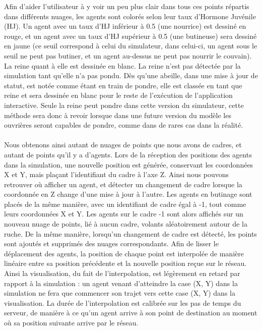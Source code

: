 		Afin d'aider l'utilisateur à y voir un peu plus clair dans tous ces points répartis dans différents nuages, les agents sont colorés selon leur taux d'Hormone Juvénile (HJ). Un agent avec un taux d'HJ inférieur à 0.5 (une nourrice) est dessiné en rouge, et un agent avec un taux d'HJ supérieur à 0.5 (une butineuse) sera dessiné en jaune (ce seuil correspond à celui du simulateur, dans celui-ci, un agent sous le seuil ne peut pas butiner, et un agent au-dessus ne peut pas nourrir le couvain). La reine quant à elle est dessinée en blanc. La reine n'est pas détectée par la simulation tant qu'elle n'a pas pondu. Dès qu'une abeille, dans une mise à jour de statut, est notée comme étant en train de pondre, elle est classée en tant que reine et sera dessinée en blanc pour le reste de l'exécution de l'application interactive. Seule la reine peut pondre dans cette version du simulateur, cette méthode sera donc à revoir lorsque dans une future version du modèle les ouvrières seront capables de pondre, comme dans de rares cas dans la réalité.
		
		\paragraph{}
		Nous obtenons ainsi autant de nuages de points que nous avons de cadres, et autant de points qu'il y a d'agents. Lors de la réception des positions des agents dans la simulation, une nouvelle position est générée, conservant les coordonnées X et Y, mais plaçant l'identifiant du cadre à l'axe Z. Ainsi nous pouvons retrouver où afficher un agent, et détecter un changement de cadre lorsque la coordonnée en Z change d'une mise à jour à l'autre. Les agents en butinage sont placés de la même manière, avec un identifiant de cadre égal à -1, tout comme leurs coordonnées X et Y. Les agents sur le cadre -1 sont alors affichés sur un nouveau nuage de points, lié à aucun cadre, volants aléatoirement autour de la ruche. De la même manière, lorsqu'un changement de cadre est détecté, les points sont ajoutés et supprimés des nuages correspondants. Afin de lisser le déplacement des agents, la position de chaque point est interpolée de manière linéaire entre sa position précédente et la nouvelle position reçue sur le réseau. Ainsi la visualisation, du fait de l'interpolation, est légèrement en retard par rapport à la simulation : un agent venant d'atteindre la case (X, Y) dans la simulation ne fera que commencer son trajet vers cette case (X, Y) dans la visualisation. La durée de l'interpolation est calibrée sur les pas de temps du serveur, de manière à ce qu'un agent arrive à son point de destination au moment où sa position suivante arrive par le réseau.
	
